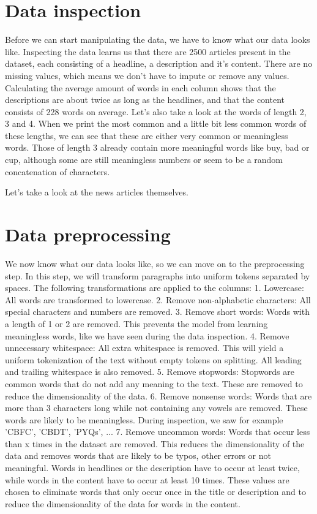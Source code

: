 \section{Data inspection}

Before we can start manipulating the data, we have to know what our data looks like. Inspecting the data learns us that there are 2500 articles present in the dataset, each consisting of a headline, a description and it's content. There are no missing values, which means we don't have to impute or remove any values. Calculating the average amount of words in each column shows that the descriptions are about twice as long as the headlines, and that the content consists of 228 words on average. Let's also take a look at the words of length 2, 3 and 4. When we print the most common and a little bit less common words of these lengths, we can see that these are either very common or meaningless words. Those of length 3 already contain more meaningful words like buy, bad or cup, although some are still meaningless numbers or seem to be a random concatenation of characters.

Let's take a look at the news articles themselves.

\section{Data preprocessing}

We now know what our data looks like, so we can move on to the preprocessing step. In this step, we will transform paragraphs into uniform tokens separated by spaces. The following transformations are applied to the columns:
1. Lowercase: All words are transformed to lowercase.
2. Remove non-alphabetic characters: All special characters and numbers are removed.
3. Remove short words: Words with a length of 1 or 2 are removed. This prevents the model from learning meaningless words, like we have seen during the data inspection.
4. Remove unnecessary whitespace: All extra whitespace is removed. This will yield a uniform tokenization of the text without empty tokens on splitting. All leading and trailing whitespace is also removed.
5. Remove stopwords: Stopwords are common words that do not add any meaning to the text. These are removed to reduce the dimensionality of the data.
6. Remove nonsense words: Words that are more than 3 characters long while not containing any vowels are removed. These words are likely to be meaningless. During inspection, we saw for example 'CBFC', 'CBDT', 'PYQs', ...
7. Remove uncommon words: Words that occur less than x times in the dataset are removed. This reduces the dimensionality of the data and removes words that are likely to be typos, other errors or not meaningful. Words in headlines or the description have to occur at least twice, while words in the content have to occur at least 10 times. These values are chosen to eliminate words that only occur once in the title or description and to reduce the dimensionality of the data for words in the content.





